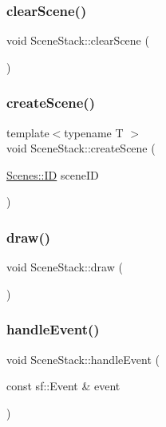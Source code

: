 \subsubsection{\texorpdfstring{clear\+Scene()}{clearScene()}}
{\footnotesize\ttfamily void Scene\+Stack\+::clear\+Scene (\begin{DoxyParamCaption}{ }\end{DoxyParamCaption})}

\hypertarget{class_scene_stack_a129b49c7bc280aeaf7c71235b3d9648d}{}\label{class_scene_stack_a129b49c7bc280aeaf7c71235b3d9648d} 
\subsubsection{\texorpdfstring{create\+Scene()}{createScene()}}
{\footnotesize\ttfamily template$<$typename T $>$ \\
void Scene\+Stack\+::create\+Scene (\begin{DoxyParamCaption}\item[{\hyperlink{namespace_scenes_a0ad7ab6856b1d77d498e3a251f6bb275}{Scenes\+::\+ID}}]{scene\+ID }\end{DoxyParamCaption})}

\hypertarget{class_scene_stack_ab4a68b2247289ba1d934067aad35159d}{}\label{class_scene_stack_ab4a68b2247289ba1d934067aad35159d} 
\subsubsection{\texorpdfstring{draw()}{draw()}}
{\footnotesize\ttfamily void Scene\+Stack\+::draw (\begin{DoxyParamCaption}{ }\end{DoxyParamCaption})}

\hypertarget{class_scene_stack_aecf75add55f527c31528043f4b28db44}{}\label{class_scene_stack_aecf75add55f527c31528043f4b28db44} 
\subsubsection{\texorpdfstring{handle\+Event()}{handleEvent()}}
{\footnotesize\ttfamily void Scene\+Stack\+::handle\+Event (\begin{DoxyParamCaption}\item[{const sf\+::\+Event \&}]{event }\end{DoxyParamCaption})}

